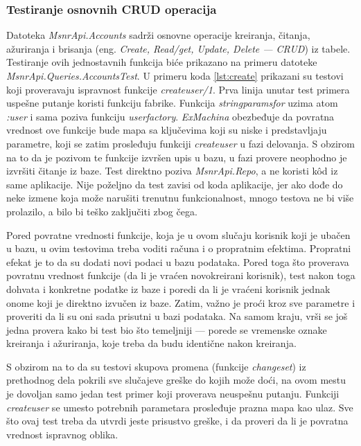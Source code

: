 \documentclass[12pt,oneside]{memoir}
\begin{document}
\subsubsection{Testiranje osnovnih CRUD operacija}

\par Datoteka \emph{MsnrApi.Accounts} sadrži osnovne operacije kreiranja, čitanja, ažuriranja i brisanja (eng. \emph{Create, Read/get, Update, Delete --- CRUD}) iz tabele. Testiranje ovih jednostavnih funkcija biće prikazano na primeru datoteke \emph{MsnrApi.Queries.AccountsTest}. U primeru koda \ref{lst:create} prikazani su testovi koji proveravaju ispravnost funkcije \emph{create{\textunderscore}user/1}. Prva linija unutar test primera uspešne putanje koristi funkciju fabrike. Funkcija \emph{string{\textunderscore}params{\textunderscore}for} uzima atom \emph{:user} i sama poziva funkciju \emph{user{\textunderscore}factory}. \emph{ExMachina} obezbeđuje da povratna vrednost ove funkcije bude mapa sa ključevima koji su niske i predstavljaju parametre, koji se zatim prosleđuju funkciji \emph{create{\textunderscore}user} u fazi delovanja. S obzirom na to da je pozivom te funkcije izvršen upis u bazu, u fazi provere neophodno je izvršiti čitanje iz baze. Test direktno poziva \emph{MsnrApi.Repo}, a ne koristi k\^{o}d iz same aplikacije. Nije poželjno da test zavisi od koda aplikacije, jer ako dođe do neke izmene koja može narušiti trenutnu funkcionalnost, mnogo testova ne bi više prolazilo, a bilo bi teško zaključiti zbog čega.  
\par Pored povratne vrednosti funkcije, koja je u ovom slučaju korisnik koji je ubačen u bazu, u ovim testovima treba voditi računa i o propratnim efektima. Propratni efekat je to da su dodati novi podaci u bazu podataka. Pored toga što proverava povratnu vrednost funkcije (da li je vraćen novokreirani korisnik), test nakon toga dohvata i konkretne podatke iz baze i poredi da li je vraćeni korisnik jednak onome koji je direktno izvučen iz baze. Zatim, važno je proći kroz sve parametre i proveriti da li su oni sada prisutni u bazi podataka. Na samom kraju, vrši se još jedna provera kako bi test bio što temeljniji --- porede se vremenske oznake kreiranja i ažuriranja, koje treba da budu identične nakon kreiranja.
\par S obzirom na to da su testovi skupova promena (funkcije \emph{changeset}) iz prethodnog dela pokrili sve slučajeve greške do kojih može doći, na ovom mestu je dovoljan samo jedan test primer koji proverava neuspešnu putanju. Funkciji \emph{create{\textunderscore}user} se umesto potrebnih parametara prosleđuje prazna mapa kao ulaz. Sve što ovaj test treba da utvrdi jeste prisustvo greške, i da proveri da li je povratna vrednost ispravnog oblika. \\
\end{document}
